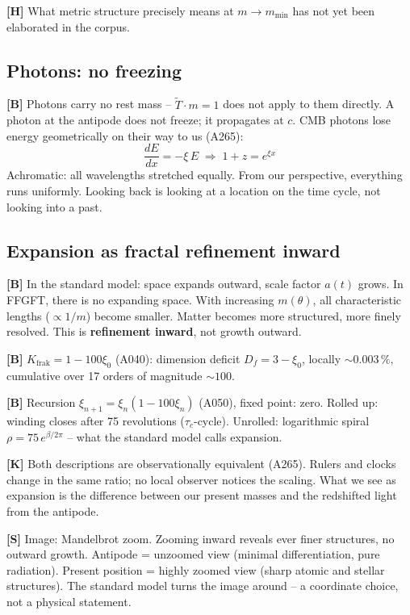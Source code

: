 \textbf{[H]} What metric structure precisely means at $m \to m_\text{min}$
has not yet been elaborated in the corpus.

\subsection{Photons: no freezing}

\textbf{[B]} Photons carry no rest mass -- $\tilde{T} \cdot m = 1$
does not apply to them directly. A photon at the antipode does not
freeze; it propagates at $c$. CMB photons lose energy geometrically
on their way to us (A265):
\[
\frac{dE}{dx} = -\xi\,E
\;\Rightarrow\;
1 + z = e^{\xi x}
\]
Achromatic: all wavelengths stretched equally.
From our perspective, everything runs uniformly. Looking back is
looking at a location on the time cycle, not looking into a past.

\subsection{Expansion as fractal refinement inward}

\textbf{[B]} In the standard model: space expands outward,
scale factor $a(t)$ grows. In FFGFT, there is no expanding space.
With increasing $m(\theta)$, all characteristic lengths
($\propto 1/m$) become smaller. Matter becomes more structured,
more finely resolved. This is \textbf{refinement inward}, not growth
outward.

\textbf{[B]} $K_\text{frak} = 1-100\xi_0$ (A040): dimension deficit
$D_f = 3-\xi_0$, locally $\sim 0.003\,\%$, cumulative over 17
orders of magnitude $\sim 100$.

\textbf{[B]} Recursion $\xi_{n+1} = \xi_n(1-100\xi_n)$ (A050),
fixed point: zero. Rolled up: winding closes after 75 revolutions
($\tau_c$-cycle). Unrolled: logarithmic spiral
$\rho = 75\,e^{\beta/2\pi}$ -- what the standard model calls expansion.

\textbf{[K]} Both descriptions are observationally equivalent (A265).
Rulers and clocks change in the same ratio; no local observer
notices the scaling. What we see as expansion is the difference
between our present masses and the redshifted light from the antipode.

\textbf{[S]} Image: Mandelbrot zoom. Zooming inward reveals ever
finer structures, no outward growth. Antipode = unzoomed view
(minimal differentiation, pure radiation). Present position =
highly zoomed view (sharp atomic and stellar structures).
The standard model turns the image around -- a coordinate choice,
not a physical statement.

